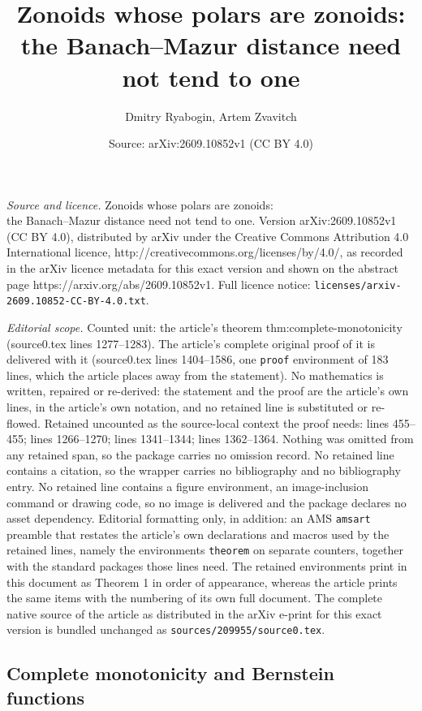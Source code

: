 \documentclass[10pt,a4paper]{amsart}
\title{Zonoids whose polars are zonoids:\\ the Banach--Mazur distance need not tend to one}
\author{Dmitry Ryabogin, Artem Zvavitch}
\date{Source: arXiv:2609.10852v1 (CC BY 4.0)}
\begin{document}
\maketitle

\noindent\emph{Source and licence.} Zonoids whose polars are zonoids:\\ the Banach--Mazur distance need not tend to one. Version arXiv:2609.10852v1 (CC BY 4.0), distributed by arXiv under the Creative Commons Attribution 4.0 International licence, http://creativecommons.org/licenses/by/4.0/, as recorded in the arXiv licence metadata for this exact version and shown on the abstract page https://arxiv.org/abs/2609.10852v1. Full licence notice: \texttt{licenses/arxiv-2609.10852-CC-BY-4.0.txt}.\par\smallskip

\noindent\textit{Editorial scope.} Counted unit: the article's theorem thm:complete-monotonicity (source0.tex lines 1277--1283). The article's complete original proof of it is delivered with it (source0.tex lines 1404--1586, one \texttt{proof} environment of 183 lines, which the article places away from the statement). No mathematics is written, repaired or re-derived: the statement and the proof are the article's own lines, in the article's own notation, and no retained line is substituted or re-flowed.  Retained uncounted as the source-local context the proof needs: lines 455--455; lines 1266--1270; lines 1341--1344; lines 1362--1364.  Nothing was omitted from any retained span, so the package carries no omission record.  No retained line contains a citation, so the wrapper carries no bibliography and no bibliography entry.  No retained line contains a figure environment, an image-inclusion command or drawing code, so no image is delivered and the package declares no asset dependency.  Editorial formatting only, in addition: an AMS \texttt{amsart} preamble that restates the article's own declarations and macros used by the retained lines, namely the environments \texttt{theorem} on separate counters, together with the standard packages those lines need.  The retained environments print in this document as Theorem 1 in order of appearance, whereas the article prints the same items with the numbering of its own full document.  The complete native source of the article as distributed in the arXiv e-print for this exact version is bundled unchanged as \texttt{sources/209955/source0.tex}.
\subsection{Complete monotonicity and Bernstein functions}\label{compmonotone}
\end{document}
